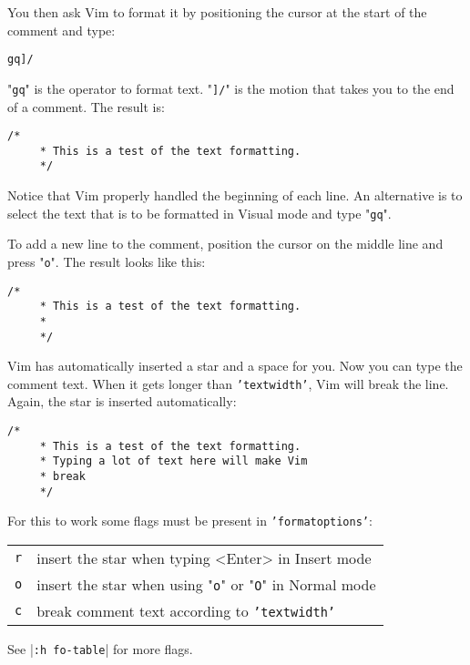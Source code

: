 You then ask Vim to format it by positioning the cursor at the start of the comment and type:

\begin{Verbatim}[samepage=true]
 gq]/
\end{Verbatim}

"\texttt{gq}" is the operator to format text.
"\texttt{]/}" is the motion that takes you to the end of a comment.
The result is:

\begin{Verbatim}[samepage=true]
    /* 
     * This is a test of the text formatting. 
     */ 
\end{Verbatim}

Notice that Vim properly handled the beginning of each line.
An alternative is to select the text that is to be formatted in Visual mode and type "\texttt{gq}".

To add a new line to the comment, position the cursor on the middle line and press "\texttt{o}".
The result looks like this:

\begin{Verbatim}[samepage=true]
    /* 
     * This is a test of the text formatting. 
     * 
     */ 
\end{Verbatim}

Vim has automatically inserted a star and a space for you.
Now you can type the comment text.
When it gets longer than \texttt{'textwidth'}, Vim will break the line.
Again, the star is inserted automatically:

\begin{Verbatim}[samepage=true]
    /* 
     * This is a test of the text formatting. 
     * Typing a lot of text here will make Vim 
     * break 
     */ 
\end{Verbatim}

For this to work some flags must be present in \texttt{'formatoptions'}:

\begin{center} \begin{tabular}{c l}
\texttt{r} & insert the star when typing <Enter> in Insert mode \\
\texttt{o} & insert the star when using "\texttt{o}" or "\texttt{O}" in Normal mode \\
\texttt{c} & break comment text according to \texttt{'textwidth'} \\
\end{tabular} \end{center}

See |\texttt{:h fo-table}| for more flags.

